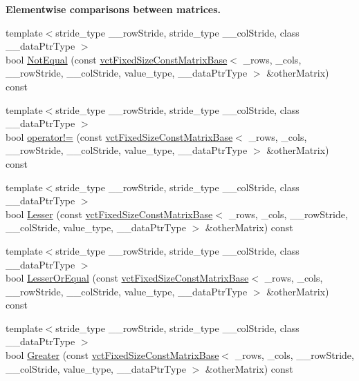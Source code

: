 \begin{Indent}{\bf Elementwise comparisons between matrices.}
\begin{DoxyCompactItemize}
\item 
{\footnotesize template$<$stride\-\_\-type \-\_\-\-\_\-row\-Stride, stride\-\_\-type \-\_\-\-\_\-col\-Stride, class \-\_\-\-\_\-data\-Ptr\-Type $>$ }\\bool \hyperlink{classvct_fixed_size_const_matrix_base_a26e8a2ddf799fe359b0df11984780514}{Not\-Equal} (const \hyperlink{classvct_fixed_size_const_matrix_base}{vct\-Fixed\-Size\-Const\-Matrix\-Base}$<$ \-\_\-rows, \-\_\-cols, \-\_\-\-\_\-row\-Stride, \-\_\-\-\_\-col\-Stride, value\-\_\-type, \-\_\-\-\_\-data\-Ptr\-Type $>$ \&other\-Matrix) const 
\item 
{\footnotesize template$<$stride\-\_\-type \-\_\-\-\_\-row\-Stride, stride\-\_\-type \-\_\-\-\_\-col\-Stride, class \-\_\-\-\_\-data\-Ptr\-Type $>$ }\\bool \hyperlink{classvct_fixed_size_const_matrix_base_ac39b9b0de05704426589029c38534731}{operator!=} (const \hyperlink{classvct_fixed_size_const_matrix_base}{vct\-Fixed\-Size\-Const\-Matrix\-Base}$<$ \-\_\-rows, \-\_\-cols, \-\_\-\-\_\-row\-Stride, \-\_\-\-\_\-col\-Stride, value\-\_\-type, \-\_\-\-\_\-data\-Ptr\-Type $>$ \&other\-Matrix) const 
\item 
{\footnotesize template$<$stride\-\_\-type \-\_\-\-\_\-row\-Stride, stride\-\_\-type \-\_\-\-\_\-col\-Stride, class \-\_\-\-\_\-data\-Ptr\-Type $>$ }\\bool \hyperlink{classvct_fixed_size_const_matrix_base_a7cc6b6429300b8aa890881823fccb014}{Lesser} (const \hyperlink{classvct_fixed_size_const_matrix_base}{vct\-Fixed\-Size\-Const\-Matrix\-Base}$<$ \-\_\-rows, \-\_\-cols, \-\_\-\-\_\-row\-Stride, \-\_\-\-\_\-col\-Stride, value\-\_\-type, \-\_\-\-\_\-data\-Ptr\-Type $>$ \&other\-Matrix) const 
\item 
{\footnotesize template$<$stride\-\_\-type \-\_\-\-\_\-row\-Stride, stride\-\_\-type \-\_\-\-\_\-col\-Stride, class \-\_\-\-\_\-data\-Ptr\-Type $>$ }\\bool \hyperlink{classvct_fixed_size_const_matrix_base_ac841e7e8a8732b7b0b96499f3c8cbaca}{Lesser\-Or\-Equal} (const \hyperlink{classvct_fixed_size_const_matrix_base}{vct\-Fixed\-Size\-Const\-Matrix\-Base}$<$ \-\_\-rows, \-\_\-cols, \-\_\-\-\_\-row\-Stride, \-\_\-\-\_\-col\-Stride, value\-\_\-type, \-\_\-\-\_\-data\-Ptr\-Type $>$ \&other\-Matrix) const 
\item 
{\footnotesize template$<$stride\-\_\-type \-\_\-\-\_\-row\-Stride, stride\-\_\-type \-\_\-\-\_\-col\-Stride, class \-\_\-\-\_\-data\-Ptr\-Type $>$ }\\bool \hyperlink{classvct_fixed_size_const_matrix_base_a1f33b761442a043221a76a6b1bc13996}{Greater} (const \hyperlink{classvct_fixed_size_const_matrix_base}{vct\-Fixed\-Size\-Const\-Matrix\-Base}$<$ \-\_\-rows, \-\_\-cols, \-\_\-\-\_\-row\-Stride, \-\_\-\-\_\-col\-Stride, value\-\_\-type, \-\_\-\-\_\-data\-Ptr\-Type $>$ \&other\-Matrix) const 

\end{DoxyCompactItemize}
\end{Indent}
